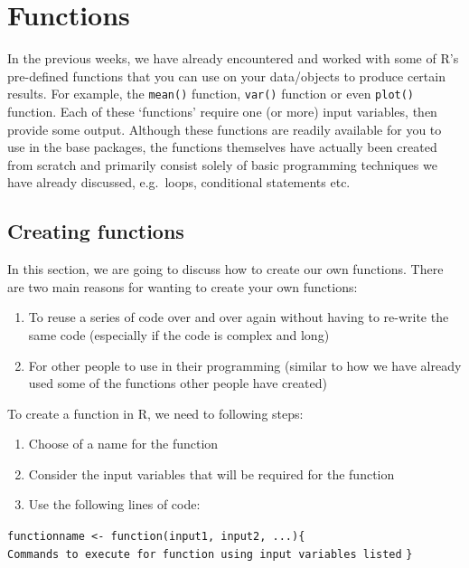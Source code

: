 \documentclass[
]{book}
\providecommand{\tightlist}{%
  \setlength{\itemsep}{0pt}\setlength{\parskip}{0pt}}
\theoremstyle{definition}
\theoremstyle{definition}
\theoremstyle{definition}
\theoremstyle{definition}
\theoremstyle{remark}
\begin{document}
\hypertarget{functions}{%
\chapter{Functions}\label{functions}}

In the previous weeks, we have already encountered and worked with some of R's pre-defined functions that you can use on your data/objects to produce certain results. For example, the \texttt{mean()} function, \texttt{var()} function or even \texttt{plot()} function. Each of these `functions' require one (or more) input variables, then provide some output. Although these functions are readily available for you to use in the base packages, the functions themselves have actually been created from scratch and primarily consist solely of basic programming techniques we have already discussed, e.g.~loops, conditional statements etc.

\hypertarget{creating-functions}{%
\section{Creating functions}\label{creating-functions}}

In this section, we are going to discuss how to create our own functions. There are two main reasons for wanting to create your own functions:

\begin{enumerate}
\def\labelenumi{\arabic{enumi}.}
\item
  To reuse a series of code over and over again without having to re-write the same code (especially if the code is complex and long)
\item
  For other people to use in their programming (similar to how we have already used some of the functions other people have created)
\end{enumerate}

To create a function in R, we need to following steps:

\begin{enumerate}
\def\labelenumi{\arabic{enumi}.}
\tightlist
\item
  Choose of a name for the function
\item
  Consider the input variables that will be required for the function
\item
  Use the following lines of code:
\end{enumerate}

\texttt{functionname\ \textless{}-\ function(input1,\ input2,\ ...)\{}
\texttt{Commands\ to\ execute\ for\ function\ using\ input\ variables\ listed}
\texttt{\}}
\end{document}
